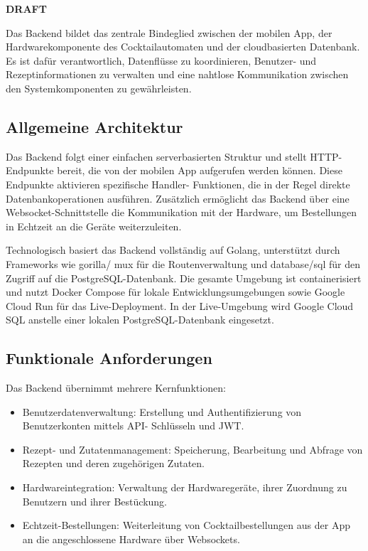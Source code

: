 
\textbf{DRAFT}

Das Backend bildet das zentrale Bindeglied zwischen der mobilen App, der Hardwarekomponente des 
Cocktailautomaten und der cloudbasierten Datenbank. Es ist dafür verantwortlich, Datenflüsse zu 
koordinieren, Benutzer- und Rezeptinformationen zu verwalten und eine nahtlose Kommunikation 
zwischen den Systemkomponenten zu gewährleisten.

\subsection{Allgemeine Architektur}

Das Backend folgt einer einfachen serverbasierten Struktur und stellt HTTP-Endpunkte bereit, die 
von der mobilen App aufgerufen werden können. Diese Endpunkte aktivieren spezifische Handler-
Funktionen, die in der Regel direkte Datenbankoperationen ausführen. Zusätzlich ermöglicht das 
Backend über eine Websocket-Schnittstelle die Kommunikation mit der Hardware, um Bestellungen in 
Echtzeit an die Geräte weiterzuleiten.

Technologisch basiert das Backend vollständig auf Golang, unterstützt durch Frameworks wie gorilla/
mux für die Routenverwaltung und database/sql für den Zugriff auf die PostgreSQL-Datenbank. Die 
gesamte Umgebung ist containerisiert und nutzt Docker Compose für lokale Entwicklungsumgebungen 
sowie Google Cloud Run für das Live-Deployment. In der Live-Umgebung wird Google Cloud SQL 
anstelle einer lokalen PostgreSQL-Datenbank eingesetzt.

\subsection{Funktionale 
Anforderungen}

Das Backend übernimmt mehrere Kernfunktionen:

\vspace{0.5cm}

\begin{itemize}
	\item Benutzerdatenverwaltung: Erstellung und Authentifizierung von Benutzerkonten mittels API-
	Schlüsseln und JWT.
	\item Rezept- und Zutatenmanagement: Speicherung, Bearbeitung und Abfrage von Rezepten und deren 
	zugehörigen Zutaten.
	\item Hardwareintegration: Verwaltung der Hardwaregeräte, ihrer Zuordnung zu Benutzern und ihrer 
	Bestückung.
	\item Echtzeit-Bestellungen: Weiterleitung von Cocktailbestellungen aus der App an die 
	angeschlossene Hardware über Websockets.
\end{itemize}

